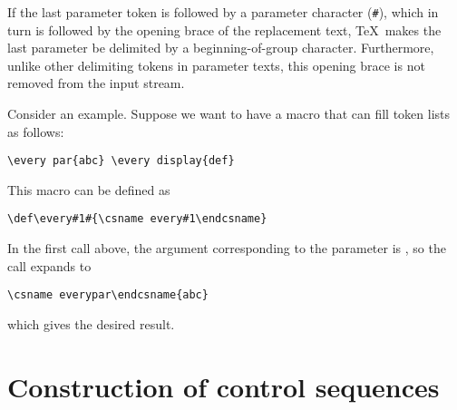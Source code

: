 If the last parameter token
is followed by a parameter character (\verb>#>),
which in turn is followed by the opening brace of the
replacement text, \TeX\ makes the last parameter
be delimited by a beginning-of-group character.
Furthermore, unlike other delimiting tokens in
parameter texts, this opening brace is not
removed from the input stream.

Consider an example.
Suppose we want to have a macro
 that can fill token lists as follows:
\begin{verbatim}
\every par{abc} \every display{def}
\end{verbatim}
This macro can be defined as
\begin{verbatim}
\def\every#1#{\csname every#1\endcsname}
\end{verbatim}
In the first call above, the argument corresponding to
the parameter is , so the call 
expands to
\begin{verbatim}
\csname everypar\endcsname{abc}
\end{verbatim}
which gives the desired result.


\section{Construction of control sequences}
\label{cs:name}


